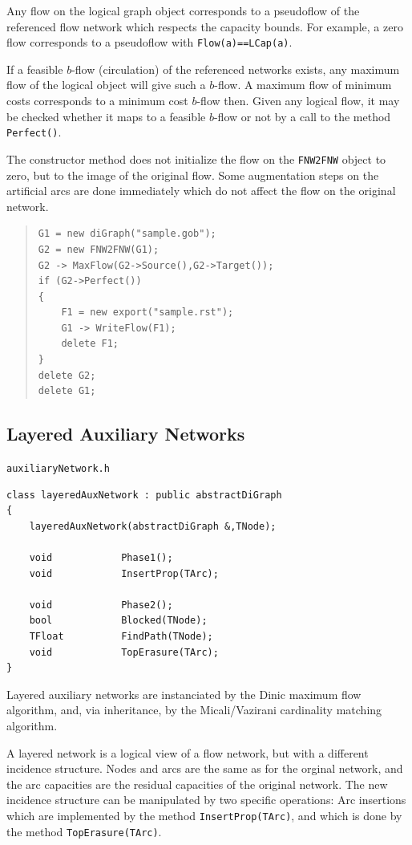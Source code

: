 \documentclass[a4paper,11pt,twoside]{book}
\begin{document}
\begin{multicols}{2}
Any flow on the logical graph object corresponds to a pseudoflow of the
referenced flow network which respects the capacity bounds. For example,
a zero flow corresponds to a pseudoflow with \verb/Flow(a)==LCap(a)/.

If a feasible $b$-flow (circulation) of the referenced networks exists, any
maximum flow of the logical object will give such a $b$-flow. A maximum flow
of minimum costs corresponds to a minimum cost $b$-flow then. Given any
logical flow, it may be checked whether it maps to a feasible $b$-flow or
not by a call to the method \verb/Perfect()/.

The constructor method does not initialize the flow on the \verb/FNW2FNW/
object to zero, but to the image of the original flow. Some augmentation steps
on the artificial arcs are done immediately which do not affect the flow on
the original network.
\sample
\begin{quote}
\begin{verbatim}
G1 = new diGraph("sample.gob");
G2 = new FNW2FNW(G1);
G2 -> MaxFlow(G2->Source(),G2->Target());
if (G2->Perfect())
{
    F1 = new export("sample.rst");
    G1 -> WriteFlow(F1);
    delete F1;
}
delete G2;
delete G1;
\end{verbatim}
\end{quote}


\subsection{Layered Auxiliary Networks}
\label{slb232}
\myinclude\verb/auxiliaryNetwork.h/
\begin{mymethods}
\begin{verbatim}
class layeredAuxNetwork : public abstractDiGraph
{
    layeredAuxNetwork(abstractDiGraph &,TNode);

    void            Phase1();
    void            InsertProp(TArc);

    void            Phase2();
    bool            Blocked(TNode);
    TFloat          FindPath(TNode);
    void            TopErasure(TArc);
}
\end{verbatim}
\end{mymethods}
Layered auxiliary networks are instanciated by the Dinic maximum flow algorithm,
and, via inheritance, by the Micali/Vazirani cardinality matching algorithm.

A layered network is a logical view of a flow network, but with a different
incidence structure. Nodes and arcs are the same as for the orginal network,
and the arc capacities are the residual capacities of the original network.
The new incidence structure can be manipulated by two specific operations:
Arc insertions which are implemented by the method \verb/InsertProp(TArc)/, and
 which is done by the method \verb/TopErasure(TArc)/.


\end{multicols}
\end{document}
